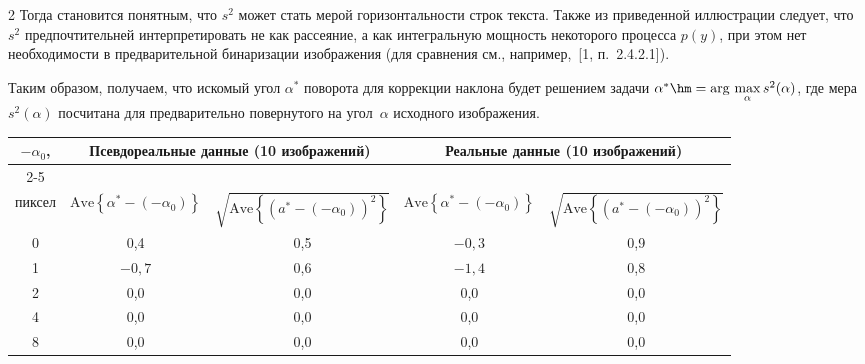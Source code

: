 \begin{multicols}{2}
      Тогда становится понятным, что $s^2$ может стать мерой горизонтальности строк 
текста. Также из приведенной иллюстрации следует, что $s^2$ предпочтительней 
интерпретировать не как рассеяние, а как интегральную мощность некоторого процесса 
$p(y)$, при этом нет необходимости в предварительной бинаризации изображения (для 
сравнения см., например,~[1, п.~2.4.2.1]). 


      
      Таким образом, получаем, что искомый угол $\alpha^*$ поворота для коррекции 
наклона будет решением задачи $\alpha^*\hm=\mathrm{arg}\,\max\limits_\alpha s^2(\alpha)$, 
где мера $s^2(\alpha)$ посчитана для предварительно повернутого на угол~$\alpha$ 
исходного изображения.
\begin{table}\small
\begin{center}
\vspace*{2ex}

\begin{tabular}{|c|c|c|c|c|}
\hline
$-\alpha_0$, &\multicolumn{2}{c|}{Псевдореальные данные (10 
изображений)}&\multicolumn{2}{c|}{Реальные данные (10 изображений)}\\
\cline{2-5}
&&&&\\[-9pt]
пиксел&$\mathrm{Ave} \left\{ \alpha^*-(-\alpha_0)\right\}$&$\sqrt{\mathrm{Ave}\left\{ (a^*-(-
\alpha_0))^2\right\}}$&$\mathrm{Ave} \left\{ \alpha^*-(-\alpha_0)\right\}$&$\sqrt{\mathrm{Ave}\left\{ (a^*-(-
\alpha_0))^2\right\}}$\\
\hline
0&0,4&0,5&$-0{,}3$\hphantom{$-$}&0,9\\
1&$-0{,}7$\hphantom{$-$}&0,6&$-1{,}4$\hphantom{$-$}&0,8\\
2&0,0&0,0&0,0&0,0\\
4&0,0&0,0&0,0&0,0\\
8&0,0&0,0&0,0&0,0\\
\hline
\end{tabular}
\end{center}
\end{table}
      

\end{multicols}
